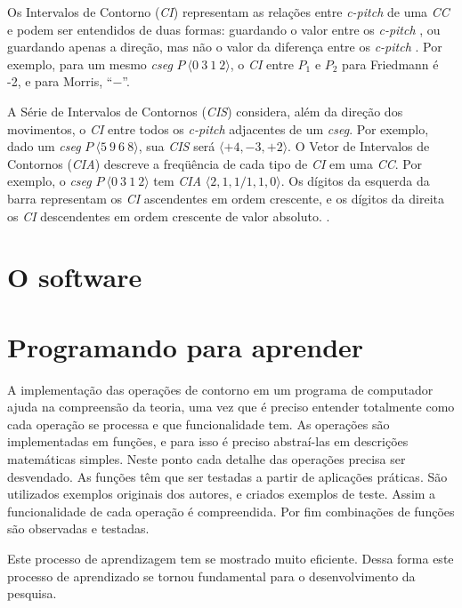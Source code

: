\documentclass[brazil]{article}
\newcommand{\termo}[1]{\textit{#1}}
\begin{document}
Os Intervalos de Contorno (\termo{CI}) representam as relações entre
\termo{c-pitch} de uma \termo{CC} e podem ser entendidos de duas
formas: guardando o valor entre os \termo{c-pitch}
\cite{friedmann85:methodology}, ou guardando apenas a direção, mas não
o valor da diferença entre os \termo{c-pitch}
\cite{morris93:directions}. Por exemplo, para um mesmo \termo{cseg}
$P\:\langle0\:3\:1\:2\rangle$, o \termo{CI} entre $P_1$ e $P_2$ para
Friedmann é -2, e para Morris, ``$-$''.

A Série de Intervalos de Contornos (\termo{CIS}) considera, além da
direção dos movimentos, o \termo{CI} entre todos os \termo{c-pitch}
adjacentes de um \termo{cseg}. Por exemplo, dado um \termo{cseg}
$P\:\langle5\:9\:6\:8\rangle$, sua \termo{CIS} será
$\langle+4,-3,+2\rangle$. O Vetor de Intervalos de Contornos
(\termo{CIA}) descreve a freqüência de cada tipo de \termo{CI} em uma
\termo{CC}. Por exemplo, o \termo{cseg} $P\:\langle0\:3\:1\:2\rangle$
tem \termo{CIA} $\langle2,1,1/1,1,0\rangle$. Os dígitos da esquerda da
barra representam os \termo{CI} ascendentes em ordem crescente, e os
dígitos da direita os \termo{CI} descendentes em ordem crescente de
valor absoluto. \cite{friedmann85:methodology}.


\section{O software}
\label{sec:o-software}

\section{Programando para aprender}
\label{sec:progr-para-aprend}

A implementação das operações de contorno em um programa de computador
ajuda na compreensão da teoria, uma vez que é preciso entender
totalmente como cada operação se processa e que funcionalidade tem. As
operações são implementadas em funções, e para isso é preciso
abstraí-las em descrições matemáticas simples. Neste ponto cada
detalhe das operações precisa ser desvendado. As funções têm que ser
testadas a partir de aplicações práticas. São utilizados exemplos
originais dos autores, e criados exemplos de teste. Assim a
funcionalidade de cada operação é compreendida. Por fim combinações de
funções são observadas e testadas.

Este processo de aprendizagem tem se mostrado muito eficiente. Dessa
forma este processo de aprendizado se tornou fundamental para o
desenvolvimento da pesquisa.
\end{document}
